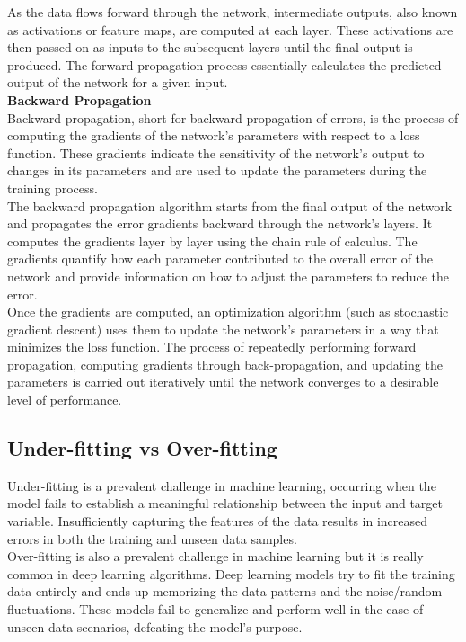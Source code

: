 As the data flows forward through the network, intermediate outputs, also known as activations or feature maps, are computed at each layer. These activations are then passed on as inputs to the subsequent layers until the final output is produced. The forward propagation process essentially calculates the predicted output of the network for a given input. \\

\vspace{0.5cm}
\textbf{Backward Propagation} \\

Backward propagation, short for backward propagation of errors, is the process of computing the gradients of the network's parameters with respect to a loss function. These gradients indicate the sensitivity of the network's output to changes in its parameters and are used to update the parameters during the training process. \\

The backward propagation algorithm starts from the final output of the network and propagates the error gradients backward through the network's layers. It computes the gradients layer by layer using the chain rule of calculus. The gradients quantify how each parameter contributed to the overall error of the network and provide information on how to adjust the parameters to reduce the error. \\

Once the gradients are computed, an optimization algorithm (such as stochastic gradient descent) uses them to update the network's parameters in a way that minimizes the loss function. The process of repeatedly performing forward propagation, computing gradients through back-propagation, and updating the parameters is carried out iteratively until the network converges to a desirable level of performance.


\subsection{Under-fitting vs Over-fitting}

Under-fitting is a prevalent challenge in machine learning, occurring when the model fails to establish a meaningful relationship between the input and target variable. Insufficiently capturing the features of the data results in increased errors in both the training and unseen data samples. \\

Over-fitting is also a prevalent challenge in machine learning but it is really common in deep learning algorithms. Deep learning models try to fit the training data entirely and ends up memorizing the data patterns and the noise/random fluctuations. These models fail to generalize and perform well in the case of unseen data scenarios, defeating the model's purpose. \\

